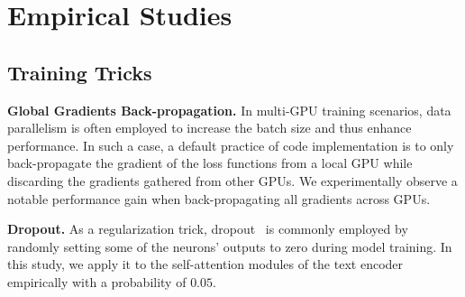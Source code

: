 \documentclass[letterpaper]{article} %
\begin{document}



% 
% 

\appendix

\section{Empirical Studies}

\subsection{Training Tricks}
\textbf{Global Gradients Back-propagation.}
In multi-GPU training scenarios, data parallelism is often employed to increase the batch size and thus enhance performance.
In such a case, a default practice of code implementation is to only back-propagate the gradient of the loss functions from a local GPU while discarding the gradients gathered from other GPUs. 
We experimentally observe a notable performance gain when back-propagating all gradients across GPUs.

\textbf{Dropout.}
As a regularization trick, dropout~\cite{srivastava2014dropout} is commonly employed by randomly setting some of the neurons' outputs to zero during model training.
In this study, we apply it to the self-attention modules of the text encoder empirically with a probability of $0.05$. 
\end{document}
